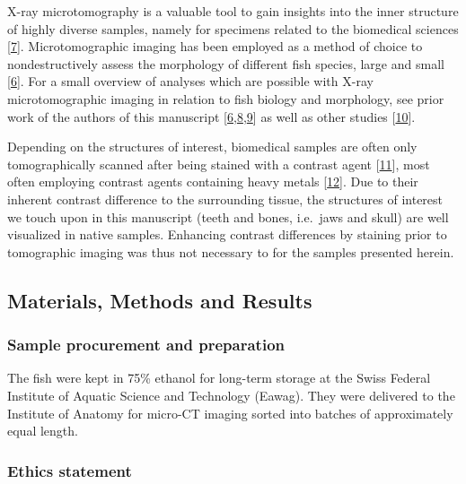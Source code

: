 X-ray microtomography is a valuable tool to gain insights into the inner structure of highly diverse samples, namely for specimens related to the biomedical sciences {[}\protect\hyperlink{ref-IKVBgaCE}{7}{]}.
Microtomographic imaging has been employed as a method of choice to nondestructively assess the morphology of different fish species, large and small {[}\protect\hyperlink{ref-19h9vxsYG}{6}{]}.
For a small overview of analyses which are possible with X-ray microtomographic imaging in relation to fish biology and morphology, see prior work of the authors of this manuscript {[}\protect\hyperlink{ref-19h9vxsYG}{6},\protect\hyperlink{ref-8Pmc2mI8}{8},\protect\hyperlink{ref-BDrCSu8p}{9}{]} as well as other studies {[}\protect\hyperlink{ref-3rxGCEvJ}{10}{]}.

Depending on the structures of interest, biomedical samples are often only tomographically scanned after being stained with a contrast agent {[}\protect\hyperlink{ref-pN1S9E5p}{11}{]}, most often employing contrast agents containing heavy metals {[}\protect\hyperlink{ref-kkBa4qNV}{12}{]}.
Due to their inherent contrast difference to the surrounding tissue, the structures of interest we touch upon in this manuscript (teeth and bones, i.e.~jaws and skull) are well visualized in native samples.
Enhancing contrast differences by staining prior to tomographic imaging was thus not necessary to for the samples presented herein.

\hypertarget{materials-methods-and-results}{%
\subsection{Materials, Methods and Results}\label{materials-methods-and-results}}

\hypertarget{sample-procurement-and-preparation}{%
\subsubsection{Sample procurement and preparation}\label{sample-procurement-and-preparation}}

The fish were kept in 75\% ethanol for long-term storage at the Swiss Federal Institute of Aquatic Science and Technology (Eawag).
They were delivered to the Institute of Anatomy for micro-CT imaging sorted into batches of approximately equal length.

\hypertarget{ethics-statement}{%
\subsubsection{Ethics statement}\label{ethics-statement}}

